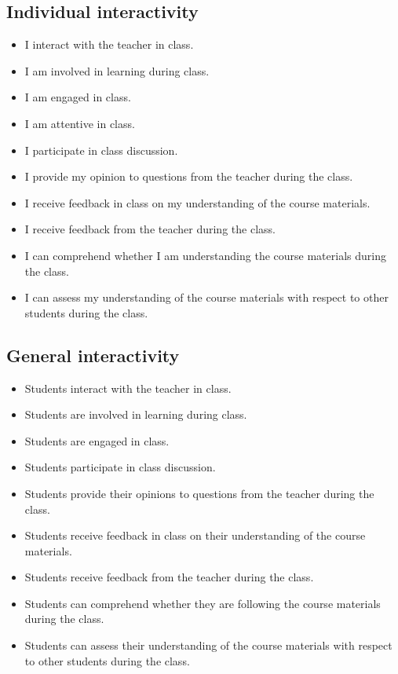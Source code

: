 \subsection{Individual interactivity}
\begin{itemize}
    \item I interact with the teacher in class.
    \item I am involved in learning during class.
    \item I am engaged in class.
    \item I am attentive in class.
    \item I participate in class discussion.
    \item I provide my opinion to questions from the teacher during the class.
    \item I receive feedback in class on my understanding of the course materials.
    \item I receive feedback from the teacher during the class.
    \item I can comprehend whether I am understanding the course materials during the class.
    \item I can assess my understanding of the course materials with respect to other students during the class.
\end{itemize}

\subsection{General interactivity}
\begin{itemize}
    \item Students interact with the teacher in class.
    \item Students are involved in learning during class.
    \item Students are engaged in class.
    \item Students participate in class discussion.
    \item Students provide their opinions to questions from the teacher during the class.
    \item Students receive feedback in class on their understanding of the course materials.
    \item Students receive feedback from the teacher during the class.
    \item Students can comprehend whether they are following the course materials during the class.
    \item Students can assess their understanding of the course materials with respect to other students during the class.
\end{itemize}

